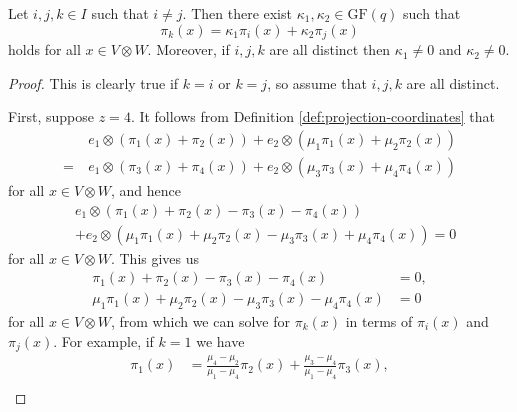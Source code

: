 \documentclass[ALCO, Unicode]{cedram}
\newcommand{\GF}{\mathrm{GF}}
\begin{document}
\begin{lemma} \label{lm:projection-relations}
Let $i, j, k \in I$ such that $i \neq j$. Then there exist $\kappa_1, \kappa_2 \in \GF{\left(q \right)}$ such that
\begin{displaymath}
    \pi_k{\left(x \right)} = \kappa_1 \pi_i{\left(x \right)} + \kappa_2 \pi_j{\left(x \right)}
\end{displaymath}
holds for all $x \in V \otimes W$. Moreover, if $i, j, k$ are all distinct then $\kappa_1 \neq 0$ and $\kappa_2 \neq 0$.
\end{lemma}
\begin{proof}
This is clearly true if $k=i$ or $k=j$, so assume that $i, j, k$ are all distinct.

First, suppose $z=4$. It follows from Definition \ref{def:projection-coordinates} that
\begin{align*}
    &e_1 \otimes \left(\pi_1{\left(x \right)} + \pi_2{\left(x \right)}\right) + e_2 \otimes \left(\mu_1 \pi_1{\left(x \right)} + \mu_2 \pi_2{\left(x \right)}\right) \\
    =\ &e_1 \otimes \left(\pi_3{\left(x \right)} + \pi_4{\left(x \right)}\right) + e_2 \otimes \left(\mu_3 \pi_3{\left(x \right)} + \mu_4 \pi_4{\left(x \right)}\right)
\end{align*}
for all $x \in V \otimes W$, and hence
\begin{align*}
    &e_1 \otimes \left(\pi_1{\left(x \right)} + \pi_2{\left(x \right)} - \pi_3{\left(x \right)} - \pi_4{\left(x \right)}\right) \\ 
    &+ e_2 \otimes \left(\mu_1 \pi_1{\left(x \right)} + \mu_2 \pi_2{\left(x \right)} - \mu_3 \pi_3{\left(x \right)} + \mu_4 \pi_4{\left(x \right)}\right) = 0
\end{align*}
for all $x \in V \otimes W$.
This gives us
\begin{align}
    \pi_1{\left(x \right)} + \pi_2{\left(x \right)} - \pi_3{\left(x \right)} - \pi_4{\left(x \right)} &= 0, \label{eqn:projection-relation-unsolved-1} \\
    \mu_1 \pi_1{\left(x \right)} + \mu_2 \pi_2{\left(x \right)} - \mu_3 \pi_3{\left(x \right)} - \mu_4 \pi_4{\left(x \right)} &= 0 \label{eqn:projection-relation-unsolved-2}
\end{align}
for all $x \in V \otimes W$, from which we can solve for $\pi_k{\left(x \right)}$ in terms of $\pi_i{\left(x \right)}$ and $\pi_j{\left(x \right)}$. For example, if $k=1$ we have
\begin{align*}
    \pi_1{\left(x \right)} &= \frac{\mu_4 - \mu_2}{\mu_1 - \mu_4} \pi_2{\left(x \right)} + \frac{\mu_3 - \mu_4}{\mu_1 - \mu_4} \pi_3{\left(x \right)}, \\

\end{align*}
\end{proof}
\end{document}
